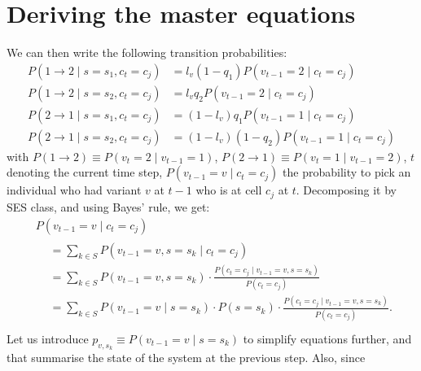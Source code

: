 \documentclass[../thesis.tex]{subfiles}
\begin{document}
\section*{Deriving the master equations}
We can then write the following transition probabilities:
\begin{equation}
    \label{eq:first_trans_probs}
    \begin{aligned}
        P(1 \rightarrow 2 \mid s = s_1, c_t = c_j)
            &= l_v (1 - q_1) P(v_{t-1} = 2 \mid c_t = c_j)
        \\
        P(1 \rightarrow 2 \mid s = s_2, c_t = c_j)
            &= l_v q_2 P(v_{t-1} = 2 \mid c_t = c_j)
        \\
        P(2 \rightarrow 1 \mid s = s_1, c_t = c_j)
            &= (1 - l_v) q_1 P(v_{t-1} = 1 \mid c_t = c_j)
        \\
        P(2 \rightarrow 1 \mid s = s_2, c_t = c_j)
            &= (1 - l_v) (1 - q_2) P(v_{t-1} = 1 \mid c_t = c_j)
    \end{aligned}
\end{equation}
with $P(1 \rightarrow 2) \equiv P(v_t = 2 \mid v_{t-1} = 1)$, $P(2 \rightarrow 1) \equiv
P(v_t = 1 \mid v_{t-1} = 2)$, $t$ denoting the current time step, $P(v_{t-1} = v \mid
c_t = c_j)$ the probability to pick an individual who had variant $v$ at $t-1$ who is at
cell $c_j$ at $t$. Decomposing it by \ac{SES} class, and using Bayes' rule, we get:
\begin{equation}
    \begin{aligned}
        &P(v_{t-1} = v \mid c_t = c_j)
        \\[1ex]
        &
        \begin{aligned}
            & = \sum_{k \in S} P(v_{t-1} = v, s = s_k \mid c_t = c_j) \\
            &= \sum_{k \in S} P(v_{t-1} = v, s = s_k)
                \cdot \frac{P(c_t = c_j \mid v_{t-1} = v, s = s_k)}{P(c_t = c_j)} \\
            &= \sum_{k \in S} P(v_{t-1} = v \mid s = s_k)
                \cdot P(s = s_k)
                \cdot \frac{P(c_t = c_j \mid v_{t-1} = v, s = s_k)}{P(c_t = c_j)}. \\
        \end{aligned}
    \end{aligned}
\end{equation}
Let us introduce $p_{v, s_k} \equiv P(v_{t-1} = v \mid s = s_k)$ to simplify equations
further, and that summarise the state of the system at the previous step. Also, since
\end{document}
